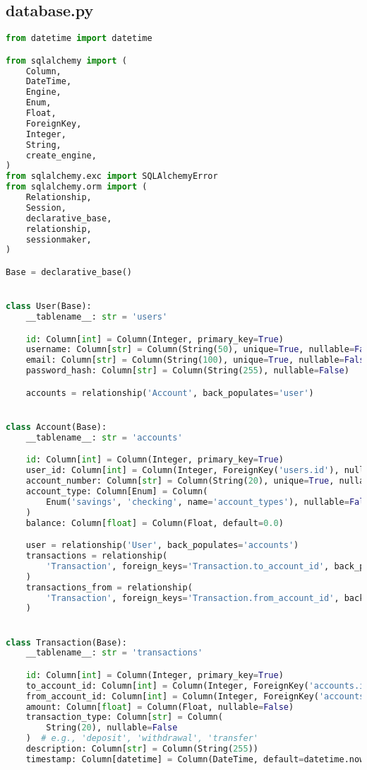 \subsection{database.py}
\begin{lstlisting}[language=Python]
from datetime import datetime

from sqlalchemy import (
	Column,
	DateTime,
	Engine,
	Enum,
	Float,
	ForeignKey,
	Integer,
	String,
	create_engine,
)
from sqlalchemy.exc import SQLAlchemyError
from sqlalchemy.orm import (
	Relationship,
	Session,
	declarative_base,
	relationship,
	sessionmaker,
)

Base = declarative_base()


class User(Base):
	__tablename__: str = 'users'

	id: Column[int] = Column(Integer, primary_key=True)
	username: Column[str] = Column(String(50), unique=True, nullable=False)
	email: Column[str] = Column(String(100), unique=True, nullable=False)
	password_hash: Column[str] = Column(String(255), nullable=False)

	accounts = relationship('Account', back_populates='user')


class Account(Base):
	__tablename__: str = 'accounts'

	id: Column[int] = Column(Integer, primary_key=True)
	user_id: Column[int] = Column(Integer, ForeignKey('users.id'), nullable=False)
	account_number: Column[str] = Column(String(20), unique=True, nullable=False)
	account_type: Column[Enum] = Column(
		Enum('savings', 'checking', name='account_types'), nullable=False
	)
	balance: Column[float] = Column(Float, default=0.0)

	user = relationship('User', back_populates='accounts')
	transactions = relationship(
		'Transaction', foreign_keys='Transaction.to_account_id', back_populates='to_account'
	)
	transactions_from = relationship(
		'Transaction', foreign_keys='Transaction.from_account_id', back_populates='from_account'
	)


class Transaction(Base):
	__tablename__: str = 'transactions'

	id: Column[int] = Column(Integer, primary_key=True)
	to_account_id: Column[int] = Column(Integer, ForeignKey('accounts.id'), nullable=False)
	from_account_id: Column[int] = Column(Integer, ForeignKey('accounts.id'), nullable=False)
	amount: Column[float] = Column(Float, nullable=False)
	transaction_type: Column[str] = Column(
		String(20), nullable=False
	)  # e.g., 'deposit', 'withdrawal', 'transfer'
	description: Column[str] = Column(String(255))
	timestamp: Column[datetime] = Column(DateTime, default=datetime.now)


\end{lstlisting}
